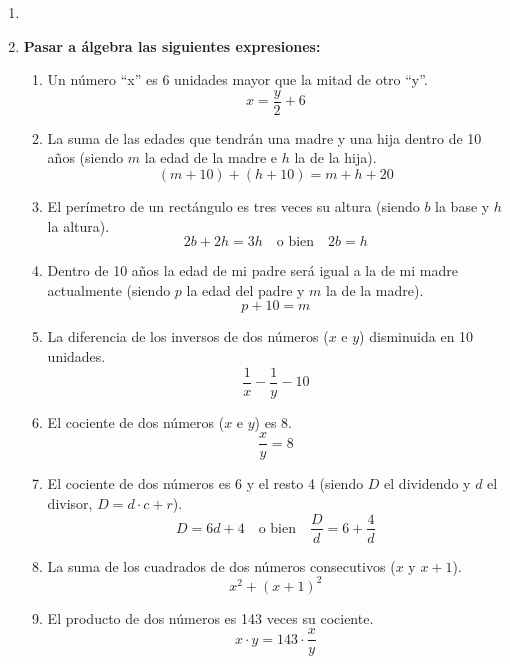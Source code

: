 \documentclass[a4paper,12pt]{article}
\begin{document}
\begin{enumerate}
\item \item \textbf{Pasar a álgebra las siguientes expresiones:}
\begin{enumerate}[label=\textbf{\alph*)}]
    \item Un número “x” es 6 unidades mayor que la mitad de otro “y”.
    \[
    x = \frac{y}{2} + 6
    \]

    \item La suma de las edades que tendrán una madre y una hija dentro de 10 años (siendo $m$ la edad de la madre e $h$ la de la hija).
    \[
    (m + 10) + (h + 10) = m + h + 20
    \]

    \item El perímetro de un rectángulo es tres veces su altura (siendo $b$ la base y $h$ la altura).
    \[
    2b + 2h = 3h \quad \text{o bien} \quad 2b = h
    \]

    \item Dentro de 10 años la edad de mi padre será igual a la de mi madre actualmente (siendo $p$ la edad del padre y $m$ la de la madre).
    \[
    p + 10 = m
    \]

    \item La diferencia de los inversos de dos números ($x$ e $y$) disminuida en 10 unidades.
    \[
    \frac{1}{x} - \frac{1}{y} - 10
    \]

    \item El cociente de dos números ($x$ e $y$) es 8.
    \[
    \frac{x}{y} = 8
    \]

    \item El cociente de dos números es 6 y el resto 4 (siendo $D$ el dividendo y $d$ el divisor, $D = d \cdot c + r$).
    \[
    D = 6d + 4 \quad \text{o bien} \quad \frac{D}{d} = 6 + \frac{4}{d}
    \]

    \item La suma de los cuadrados de dos números consecutivos ($x$ y $x+1$).
    \[
    x^2 + (x + 1)^2
    \]

    \item El producto de dos números es 143 veces su cociente.
    \[
    x \cdot y = 143 \cdot \frac{x}{y}
    \]
\end{enumerate}



\end{enumerate}
\end{document}
